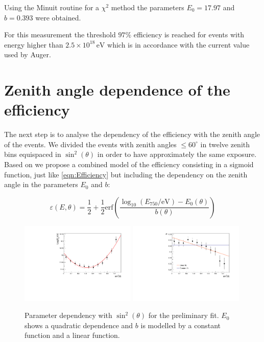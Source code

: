 \documentclass[12pt,a4paper]{article}
\newcommand{\eV}{\, \mathrm{eV}}
\begin{document}
Using the Minuit routine for a $\chi^2$ method the parameters $E_0=17.97$ and $b=0.393$ were obtained.

For this measurement the threshold $97\%$ efficiency is reached for events with energy higher than $2.5\times10^{18}\eV$ which is in accordance with the current value used by Auger.




\section{Zenith angle dependence of the efficiency}
\label{sec:zenith}

The next step is to analyse the dependency of the efficiency with the zenith angle of the events. We divided the events with zenith angles $\leq60^{\circ}$ in twelve zenith bins equispaced in $\sin^2(\theta)$ in order to have approximately the same exposure. Based on \cite{VerticalSpectrum} we propose a combined model of the efficiency consisting in a sigmoid function, just like \cref{eqn:Efficiency} but including the dependency on the zenith angle in the parameters $E_0$ and $b$:

\begin{equation}
\varepsilon(E,\theta)=\frac{1}{2} + \frac{1}{2}\mathrm{erf}\left(\frac{\log_{10}(E_{750}/\mathrm{eV})-E_{0}(\theta)}{b(\theta)}\right)
\label{eqn:EffiZenith}
\end{equation}

\begin{figure}[h]
    \begin{center}
        \includegraphics[width=0.49\textwidth]{plots/E0.pdf}
        \includegraphics[width=0.49\textwidth]{plots/b.pdf}
        \caption{Parameter dependency with $\sin^2(\theta)$ for the preliminary fit. $E_0$ shows a quadratic dependence and $b$ is modelled by a constant function and a linear function.
        \label{fig:parameters}}
        \vspace{-0.5cm}
    \end{center}
\end{figure} 
\end{document}
